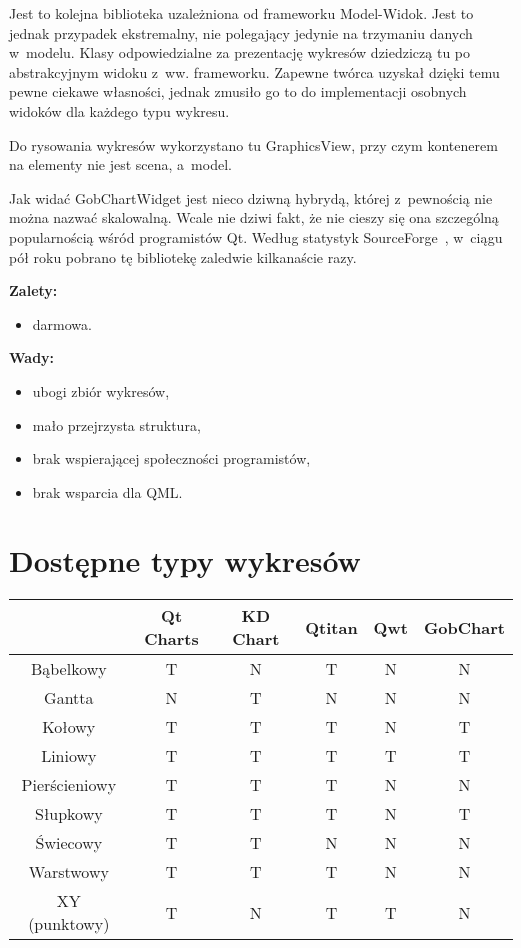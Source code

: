 Jest to kolejna biblioteka uzależniona od frameworku Model-Widok. Jest to jednak przypadek ekstremalny, nie polegający jedynie na trzymaniu danych w~modelu. Klasy odpowiedzialne za prezentację wykresów dziedziczą tu po abstrakcyjnym widoku z~ww. frameworku. Zapewne twórca uzyskał dzięki temu pewne ciekawe własności, jednak zmusiło go to do implementacji osobnych widoków dla każdego typu wykresu.\newline

Do rysowania wykresów wykorzystano tu GraphicsView, przy czym kontenerem na elementy nie jest scena, a~model.\newline

Jak widać GobChartWidget jest nieco dziwną hybrydą, której z~pewnością nie można nazwać skalowalną. Wcale nie dziwi fakt, że nie cieszy się ona szczególną popularnością wśród programistów Qt. Według statystyk SourceForge~\cite{forge}, w~ciągu pół roku pobrano tę bibliotekę zaledwie kilkanaście razy.

\textbf{Zalety:}
\begin{itemize}
\item{darmowa.}\newline
\end{itemize}

\textbf{Wady:}
\begin{itemize}
\item{ubogi zbiór wykresów,}
\item{mało przejrzysta struktura,}
\item{brak wspierającej społeczności programistów,}
\item{brak wsparcia dla QML.}
\end{itemize}



\section{Dostępne typy wykresów}
\begin{tabular}{|c|c|c|c|c|c|}
\hline
&  Qt Charts & KD Chart & Qtitan & Qwt & GobChart\\
\hline
Bąbelkowy & T & N & T & N & N\\
\hline
Gantta & N & T & N & N & N\\
\hline
Kołowy & T & T & T & N & T\\
\hline
Liniowy & T & T & T & T & T\\
\hline
Pierścieniowy & T & T & T & N & N\\
\hline
Słupkowy & T & T & T & N & T\\
\hline
Świecowy & T & T & N & N & N\\
\hline
Warstwowy & T & T & T & N & N\\
\hline
XY (punktowy) & T & N & T & T & N\\
\hline

\end{tabular}


